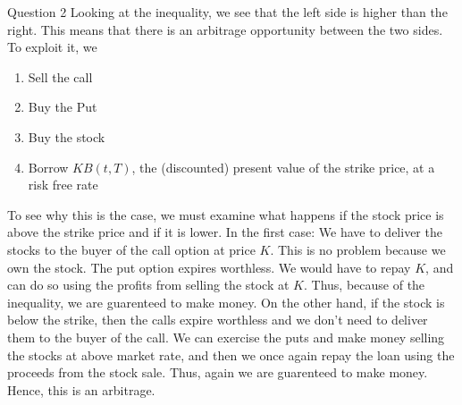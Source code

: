 \documentclass[12pt]{exam}
\begin{document}
\begin{questions}
\question Question 2\newline
Looking at the inequality, we see that the left side is higher than the right. This means that there is an arbitrage opportunity between the two sides. To exploit it, we 
\begin{enumerate}
    \item Sell the call
    \item Buy the Put
    \item Buy the stock
    \item Borrow $KB(t,T)$, the (discounted) present value of the strike price, at a risk free rate
\end{enumerate}
To see why this is the case, we must examine what happens if the stock price is above the strike price and if it is lower. In the first case:\newline
We have to deliver the stocks to the buyer of the call option at price $K$. This is no problem because we own the stock. The put option expires worthless. We would have to repay $K$, and can do so using the profits from selling the stock at $K$. Thus, because of the inequality, we are guarenteed to make money. 
\newline
On the other hand, if the stock is below the strike, then the calls expire worthless and we don't need to deliver them to the buyer of the call. We can exercise the puts and make money selling the stocks at above market rate, and then we once again repay the loan using the proceeds from the stock sale. Thus, again we are guarenteed to make money. Hence, this is an arbitrage.
\end{questions}
\end{document}

